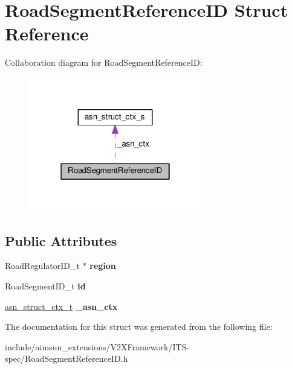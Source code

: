 \hypertarget{structRoadSegmentReferenceID}{}\section{Road\+Segment\+Reference\+ID Struct Reference}
\label{structRoadSegmentReferenceID}


Collaboration diagram for Road\+Segment\+Reference\+ID\+:\nopagebreak
\begin{figure}[H]
\begin{center}
\leavevmode
\includegraphics[width=214pt]{structRoadSegmentReferenceID__coll__graph}
\end{center}
\end{figure}
\subsection*{Public Attributes}
\begin{DoxyCompactItemize}
\item 
Road\+Regulator\+I\+D\+\_\+t $\ast$ {\bfseries region}\hypertarget{structRoadSegmentReferenceID_a80a1a4e8996a3b4e9d2a379a8d7a4eca}{}\label{structRoadSegmentReferenceID_a80a1a4e8996a3b4e9d2a379a8d7a4eca}

\item 
Road\+Segment\+I\+D\+\_\+t {\bfseries id}\hypertarget{structRoadSegmentReferenceID_a7fefa09bf1483c07066863810311462d}{}\label{structRoadSegmentReferenceID_a7fefa09bf1483c07066863810311462d}

\item 
\hyperlink{structasn__struct__ctx__s}{asn\+\_\+struct\+\_\+ctx\+\_\+t} {\bfseries \+\_\+asn\+\_\+ctx}\hypertarget{structRoadSegmentReferenceID_a33905434e3412f3f1824aff46bf95e51}{}\label{structRoadSegmentReferenceID_a33905434e3412f3f1824aff46bf95e51}

\end{DoxyCompactItemize}


The documentation for this struct was generated from the following file\+:\begin{DoxyCompactItemize}
\item 
include/aimsun\+\_\+extensions/\+V2\+X\+Framework/\+I\+T\+S-\/spec/Road\+Segment\+Reference\+I\+D.\+h\end{DoxyCompactItemize}

